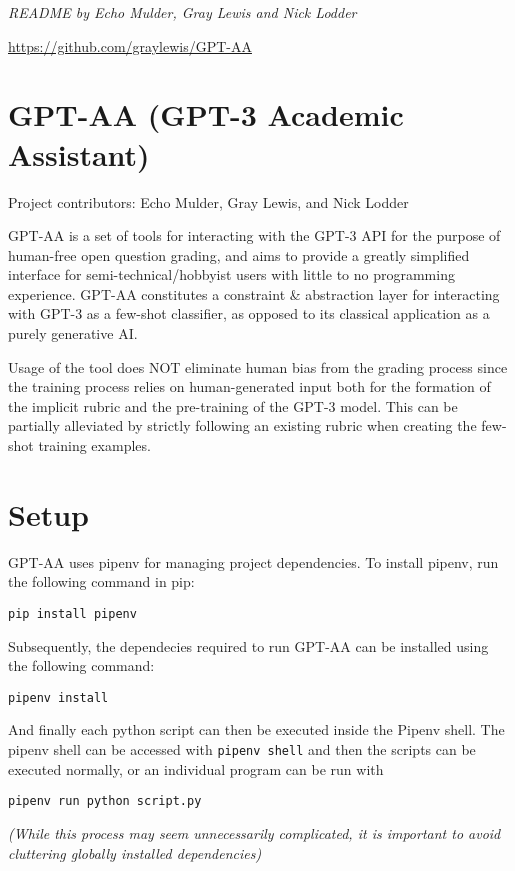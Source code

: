 \documentclass[
]{article}
\author{}
\date{}
\begin{document}
\emph{README by Echo Mulder, Gray Lewis and Nick Lodder}

\url{https://github.com/graylewis/GPT-AA}

\hypertarget{gpt-aa-gpt-3-academic-assistant}{%
\section{GPT-AA (GPT-3 Academic
Assistant)}\label{gpt-aa-gpt-3-academic-assistant}}

Project contributors: Echo Mulder, Gray Lewis, and Nick Lodder

GPT-AA is a set of tools for interacting with the GPT-3 API for the
purpose of human-free open question grading, and aims to provide a
greatly simplified interface for semi-technical/hobbyist users with
little to no programming experience. GPT-AA constitutes a constraint \&
abstraction layer for interacting with GPT-3 as a few-shot classifier,
as opposed to its classical application as a purely generative AI.

Usage of the tool does NOT eliminate human bias from the grading process
since the training process relies on human-generated input both for the
formation of the implicit rubric and the pre-training of the GPT-3
model. This can be partially alleviated by strictly following an
existing rubric when creating the few-shot training examples.

\hypertarget{setup}{%
\section{Setup}\label{setup}}

GPT-AA uses pipenv for managing project dependencies. To install pipenv,
run the following command in pip:

\texttt{pip\ install\ pipenv}

Subsequently, the dependecies required to run GPT-AA can be installed
using the following command:

\texttt{pipenv\ install}

And finally each python script can then be executed inside the Pipenv
shell. The pipenv shell can be accessed with \texttt{pipenv\ shell} and
then the scripts can be executed normally, or an individual program can
be run with

\texttt{pipenv\ run\ python\ script.py}

\emph{(While this process may seem unnecessarily complicated, it is
important to avoid cluttering globally installed dependencies)}
\end{document}
